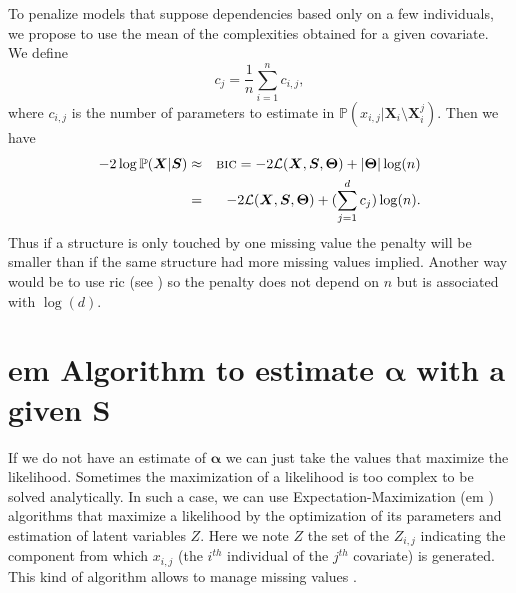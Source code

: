 \documentclass[12pt,a4paper]{report}
\begin{document}
			To penalize models that suppose dependencies based only on a few individuals, we propose to use the mean of the complexities obtained for a given covariate. We define
			\begin{equation}
			c_j=\frac{1}{n}\sum_{i=1}^nc_{i,j},  \nonumber 
\end{equation}						where $c_{i,j}$ is the number of parameters to estimate in $\mathbb{P}(x_{i,j}|\boldsymbol{X}_i\setminus \boldsymbol{X}_i^j)$. Then we have
			\begin{eqnarray}
		-2\log \mathbb{P}(\boldsymbol{X}|\boldsymbol{S})&\approx & \mbox{{\sc bic}}=-2\mathcal{L}(\boldsymbol{X},\boldsymbol{S},\boldsymbol{\Theta})+|\boldsymbol{\Theta}|\log(n) \nonumber  \\
		&=& -2\mathcal{L}(\boldsymbol{X},\boldsymbol{S},\boldsymbol{\Theta})+(\sum_{j=1}^dc_j)\log(n). \nonumber 
	\end{eqnarray}
			 Thus if a structure is only touched by one missing value the penalty will be smaller than if the same structure had more missing values implied.
			Another way would be to use {\sc ric} (see \cite{foster1994risk}) so the penalty does not depend on $n$ but is associated with $\log(d)$. %
		
%	
			
%	

	\section{{\sc em} Algorithm to estimate $\boldsymbol{\alpha}$ with a given $\boldsymbol{S}$}
			If we do not have an estimate of $\boldsymbol{\alpha}$ we can just take the values that maximize the likelihood. Sometimes the maximization of a likelihood is too complex to be solved analytically. In such a case, we can use Expectation-Maximization ({\sc em} \cite{mclachlan2007algorithm}) algorithms \cite{mclachlan2007algorithm} that maximize a likelihood by the optimization of its parameters and estimation of latent variables $Z$. 
Here we note $Z$ the set of the $Z_{i,j}$ indicating the component from which $x_{i,j}$ (the $i^{th}$ individual of the $j^{th}$ covariate) is generated.			
			This kind of algorithm allows to manage missing values \cite{dempster1977maximum}. \\
			
\end{document}
